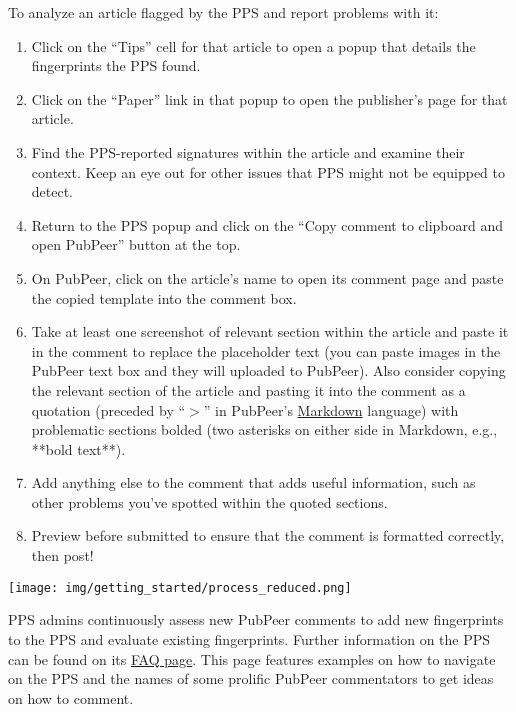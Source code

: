 \documentclass[letterpaper, 12pt]{article}
\begin{document}


To analyze an article flagged by the PPS and report problems with it:

\begin{enumerate}
    \setlength\itemsep{-0.5em}
    \item Click on the ``Tips'' cell for that article to open a popup that details the fingerprints the PPS found.
    \item Click on the ``Paper'' link in that popup to open the publisher's page for that article.
    \item Find the PPS-reported signatures within the article and examine their context. Keep an eye out for other issues that PPS might not be equipped to detect.
    \item Return to the PPS popup and click on the ``Copy comment to clipboard and open PubPeer'' button at the top.
    \item On PubPeer, click on the article's name to open its comment page and paste the copied template into the comment box.
    \item Take at least one screenshot of relevant section within the article and paste it in the comment to replace the placeholder text (you can paste images in the PubPeer text box and they will uploaded to PubPeer). Also consider copying the relevant section of the article and pasting it into the comment as a quotation (preceded by ``$>$'' in PubPeer's \href{https://pubpeer.com/static/markdown}{Markdown} language) with problematic sections bolded (two asterisks on either side in Markdown, e.g., **bold text**).
    \item Add anything else to the comment that adds useful information, such as other problems you've spotted within the quoted sections.
    \item Preview before submitted to ensure that the comment is formatted correctly, then post!
\end{enumerate}

\texttt{[image: img/getting\_started/process\_reduced.png]}

PPS admins continuously assess new PubPeer comments to add new fingerprints to the PPS and evaluate existing fingerprints. Further information on the PPS can be found on its \href{https://www.irit.fr/~Guillaume.Cabanac/problematic-paper-screener/faq}{FAQ page}. This page features examples on how to navigate on the PPS and the names of some prolific PubPeer commentators to get ideas on how to comment.
\end{document}
